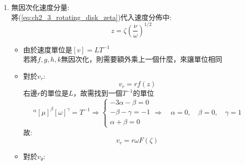 \documentclass[../main.tex]{subfiles}
\begin{document}
\begin{itemize}
\begin{enumerate}
    \begin{equation}
      \begin{cases}
        -3\alpha - \beta = 1 \\
        -\beta - \gamma = 0 \\
        \alpha + \beta = 0
      \end{cases}
      \Rightarrow \quad \alpha = -\frac{1}{2}, \quad \beta = \frac{1}{2}, \quad \gamma = -\frac{1}{2}
    \end{equation}
    故無因次化的長度為:
    \begin{equation}
      L = \left(\frac{\mu}{\omega\rho}\right)^{1/2}
    \end{equation}
    故無因次化變數為:
    \begin{equation}
      \boxed{\zeta = z \left(\frac{\omega \rho}{\mu}\right)^{1/2} = \frac{z}{\sqrt{\nu/\omega}}} \label{eq:ch2_3_rotating_disk_zeta}
    \end{equation}
    \item 無因次化速度分量:\\
    將(\ref{eq:ch2_3_rotating_disk_zeta})代入速度分佈中:
    \begin{equation}
      z = \zeta \left(\frac{\nu}{\omega}\right)^{1/2}
    \end{equation}
    \begin{itemize}
      \item  由於速度單位是$[v] = L T^{-1}$\\
      若將$f,g,h,k$無因次化，則需要額外乘上一個什麼，來讓單位相同
      \item 對於$v_r$:
      \begin{equation}
        v_r = r f(z)
      \end{equation}
      右邊$r$的單位是$L$，故需找到一個$T^{-1}$的單位
      \begin{equation}
        [\rho]^\alpha [\mu]^\beta [\omega]^\gamma = T^{-1} \Rightarrow
        \begin{cases}
          -3\alpha - \beta = 0 \\
          -\beta - \gamma = -1 \\
          \alpha + \beta = 0
        \end{cases}
        \Rightarrow \quad \alpha = 0, \quad \beta = 0, \quad \gamma = 1
      \end{equation}
      故:
      \begin{equation}
        \boxed{v_r = r \omega F(\zeta)}
      \end{equation}
      \item 對於$v_\theta$:

\end{itemize}
\end{enumerate}
\end{itemize}
\end{document}
